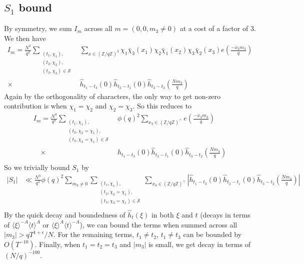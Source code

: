 \subsection{$S_1$ bound}
By symmetry, we sum $I_m$ across all $m=(0,0,m_3\neq 0)$ at a cost of a factor of $3$.
We then have \begin{align*}
    I_m=\frac{N^3}{q^3}\sum_{\substack{(t_1,\chi_1),\\(t_2,\chi_2),\\(t_3,\chi_3)\in\mathcal{S}}} &\sum_{x\in (\mathbb{Z}/q\mathbb{Z})^3}\chi_1\bar{\chi}_3(x_1)\chi_2\bar{\chi}_1(x_2)\chi_3\bar{\chi}_2(x_3) e\left(\frac{-x_3 m_3}{q}\right)\\
    \times \ &\hat{h}_{t_1-t_3}\left(0\right)\hat{h}_{t_2-t_1}\left(0\right)\hat{h}_{t_3-t_2}\left(\frac{Nm_3}{q}\right)
\end{align*}
Again by the orthogonality of characters, the only way to get non-zero contribution is when $\chi_1=\chi_2$ and $\chi_2=\chi_3$. So this reduces to\begin{align*}
    I_m=\frac{N^3}{q^3}\sum_{\substack{(t_1,\chi_1),\\(t_2,\chi_2=\chi_1),\\(t_3,\chi_3=\chi_1)\in\mathcal{S}}} &\phi(q)^2 \sum_{x_3\in (\mathbb{Z}/q\mathbb{Z})^{\times}}e\left(\frac{-x_3 m_3}{q}\right)\\
   \quad  \times \ &\hat{h}_{t_1-t_3}\left(0\right)\hat{h}_{t_2-t_1}\left(0\right)\hat{h}_{t_3-t_2}\left(\frac{Nm_3}{q}\right)\\
\end{align*}
So we trivially bound $S_1$ by\begin{align*}
    |S_1|&\ll  \frac{N^3}{q^3} \phi(q)^2 \sum_{m_3\neq 0}\sum_{\substack{(t_1,\chi_1),\\(t_2,\chi_2=\chi_1),\\(t_3,\chi_3=\chi_1)\in\mathcal{S}}} \sum_{x_3\in (\mathbb{Z}/q\mathbb{Z})^{\times}}
   \left|\hat{h}_{t_1-t_3}\left(0\right)\hat{h}_{t_2-t_1}\left(0\right)\hat{h}_{t_3-t_2}\left(\frac{Nm_3}{q}\right)\right|\\
\end{align*}
By the quick decay and boundedness of $\hat{h}_t(\xi)$ in both $\xi$ and $t$ (decays in terms of $\langle \xi \rangle^{-A}\langle t \rangle^A $ or $ \langle \xi \rangle^A\langle t \rangle^{-A} $), we can bound the terms when summed across all $|m_3|>qT^{1+\epsilon}/N$. For the remaining terms, $t_1\neq t_2$, $t_1\neq t_3$ can be bounded by $O(T^{-10})$.
Finally, when $t_1=t_2=t_3$ and $|m_3|$ is small, we get decay in terms of $(N/q)^{-100}$. 

